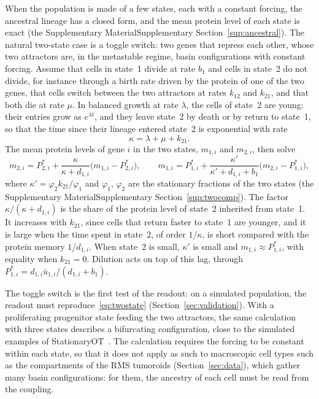 \documentclass[a4paper, 11pt]{article}
\newcommand{\supref}[1]{\ifsimplified the Supplementary Material\else Supplementary Section~\ref{#1}\fi}
\theoremstyle{plain}
\theoremstyle{remark}
\begin{document}
When the population is made of a few states, each with a constant forcing, the ancestral lineage has a closed form, and the mean protein level of each state is exact (\supref{sup:ancestral}). The natural two-state case is a toggle switch: two genes that repress each other, whose two attractors are, in the metastable regime, basin configurations with constant forcing. Assume that cells in state~1 divide at rate $b_1$ and cells in state~2 do not divide, for instance through a birth rate driven by the protein of one of the two genes, that cells switch between the two attractors at rates $k_{12}$ and $k_{21}$, and that both die at rate $\mu$. In balanced growth at rate $\lambda$, the cells of state~2 are young: their entries grow as $e^{\lambda t}$, and they leave state~2 by death or by return to state~1, so that the time since their lineage entered state~2 is exponential with rate
\begin{equation}\label{eq:kappa}
\kappa = \lambda + \mu + k_{21}.
\end{equation}
The mean protein levels of gene $i$ in the two states, $m_{1,i}$ and $m_{2,i}$, then solve
\begin{equation}\label{eq:twostate}
m_{2,i} = P^\ast_{2,i} + \frac{\kappa}{\kappa + d_{1,i}}\bigl(m_{1,i} - P^\ast_{2,i}\bigr), \qquad
m_{1,i} = P^\ast_{1,i} + \frac{\kappa'}{\kappa' + d_{1,i} + b_1}\bigl(m_{2,i} - P^\ast_{1,i}\bigr),
\end{equation}
where $\kappa' = \varphi_2 k_{21}/\varphi_1$ and $\varphi_1$, $\varphi_2$ are the stationary fractions of the two states (\supref{sup:twocomp}). The factor $\kappa/(\kappa + d_{1,i})$ is the share of the protein level of state~2 inherited from state~1. It increases with $k_{21}$, since cells that return faster to state~1 are younger, and it is large when the time spent in state~2, of order $1/\kappa$, is short compared with the protein memory $1/d_{1,i}$. When state~2 is small, $\kappa'$ is small and $m_{1,i} \approx P^\ast_{1,i}$, with equality when $k_{21} = 0$. Dilution acts on top of this lag, through $P^\ast_{1,i} = d_{1,i}\bar u_{1,i}/(d_{1,i} + b_1)$.

The toggle switch is the first test of the readout: on a simulated population, the readout must reproduce~\eqref{eq:twostate} (Section~\ref{sec:validation}). With a proliferating progenitor state feeding the two attractors, the same calculation with three states describes a bifurcating configuration, close to the simulated examples of StationaryOT~\cite{zhang2021stationaryot}. The calculation requires the forcing to be constant within each state, so that it does not apply as such to macroscopic cell types such as the compartments of the RMS tumoroids (Section~\ref{sec:data}), which gather many basin configurations: for them, the ancestry of each cell must be read from the coupling.
\end{document}
